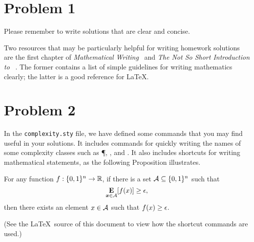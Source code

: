 \documentclass[11pt]{article}
\begin{document}
\MakeHeader

\section{Problem 1}
Please remember to write solutions that are clear and concise.  

Two resources that may be particularly helpful for writing homework solutions 
 are the first chapter of {\it Mathematical 
Writing}~\cite{KLR96} and {\it The Not So Short Introduction to 
\LaTeXe}~\cite{OPHS08}.  The former contains a list of simple guidelines for 
writing mathematics clearly; the latter is a good reference for \LaTeX.  


\section{Problem 2}
In the \texttt{complexity.sty} file, we have defined some commands that you may find useful 
in your solutions.  It includes commands for quickly writing the names of some complexity 
classes such as \P, \NP, and \EXP.  It also includes shortcuts for writing mathematical statements, 
as the following Proposition illustrates.

\begin{proposition}
For any function $f : \{0,1\}^n \to \mathbb R$, if there is a set ${\cal A} \subseteq \{0,1\}^n$ such that
$$
\mathop{\bf E\/}_{{\boldsymbol{x}} \in {\cal A}}[ f(x) ] \ge \epsilon,
$$
then there exists an element $x \in {\cal A}$ such that $f(x) \ge \epsilon$.
\end{proposition}

(See the \LaTeX\ source of this document to view how the shortcut commands are used.)  


\end{document}
